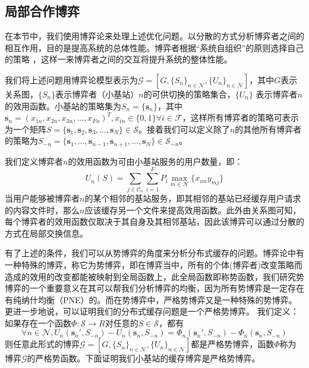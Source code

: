 \documentclass[bachelor]{seuthesis} %
\begin{document}
\begin{Main}
\section{局部合作博弈}
在本节中，我们使用博弈论来处理上述优化问题。以分散的方式分析博弈者之间的相互作用，目的是提高系统的总体性能。博弈者根据“系统自组织”的原则选择自己的策略
\cite{prehofer2005self}，这样一来博弈者之间的交互将提升系统的整体性能。\par
我们将上述问题用博弈论模型表示为$\mathcal{G}=[G,\{S_n\}_{n\in\mathcal{N}},\{U_n\}_{n\in\mathcal{N}}]$，其中$G$表示关系图，$\{S_n\}$表示博弈者（小基站）$n$的可供切换的策略集合，$\{U_n\}$ 表示博弈者$n$的效用函数。小基站的策略集为$S_n=\{\textbf{s}_n\}$，其中$\textbf{s}_n=(x_{1n},x_{2n},x_{3n},\dots,x_{Fn})^T,x_{in}\in\{0,1\}\forall i\in\mathcal{F}$，这样所有博弈者的策略可表示为一个矩阵$S=\{\textbf{s}_1,\textbf{s}_2,\textbf{s}_3,\dots,\textbf{s}_N\}\in\mathcal{S}$。接着我们可以定义除了$n$的其他所有博弈者的策略为$S_{-n}=\{\textbf{s}_1,\dots,\textbf{s}_{n-1},\textbf{s}_{n+1},\dots,\textbf{s}_N\}\in\mathcal{S}_{-n}$。\par
我们定义博弈者$n$的效用函数为可由小基站服务的用户数量，即：
\begin{equation}
U_n(S)=\sum_{j\in\mathcal{C}_n}\sum_{i=1}^FP_i\max_{m\in\mathcal{N}}\{x_{im}y_{mj}\}
\end{equation}
当用户能够被博弈者$n$的某个相邻的基站服务，即其相邻的基站已经缓存用户请求的内容文件时，那么$n$应该缓存另一个文件来提高效用函数。此外由关系图可知，每个博弈者的效用函数仅取决于其自身及其相邻基站，因此该博弈可以通过分散的方式在局部交换信息。\par
有了上述的条件，我们可以从势博弈的角度来分析分布式缓存的问题。博弈论中有一种特殊的博弈，称它为势博弈，即在博弈当中，所有的个体(博弈者)改变策略而造成的效用的改变都能被映射到全局函数上，此全局函数即称势函数，我们研究势博弈的一个重要意义在其可以帮我们分析博弈的均衡，因为所有势博弈是一定存在有纯纳什均衡（PNE）的。而在势博弈中，严格势博弈又是一种特殊的势博弈。更进一步地说，可以证明我们的分布式缓存问题是一个严格势博弈。
我们定义：如果存在一个函数$\Phi:\mathcal{S}\rightarrow R$对任意的$S\in\mathcal{S}$，都有
\begin{equation}
\forall n\in\mathcal{N},U_n(\textbf{s}_n',S_{-n})-U_n(\textbf{s}_n,S_{-n})=\Phi_n(\textbf{s}_n',S_{-n})-\Phi_n(\textbf{s}_n,S_{-n})
\end{equation}
则任意此形式的博弈$\mathcal{G}=[G,\{S_n\}_{n\in\mathcal{N}},\{U_n\}_{n\in\mathcal{N}}]$都是严格势博弈，函数$\Phi$称为博弈$\mathcal{G}$的严格势函数。下面证明我们小基站的缓存博弈是严格势博弈。\par

\end{Main}
\end{document}
